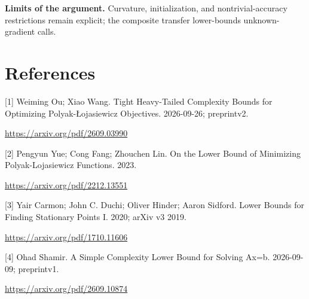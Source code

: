 \documentclass[10pt,a4paper]{article}
\begin{document}
\textbf{Limits of the argument.} Curvature, initialization, and nontrivial-accuracy restrictions remain explicit; the composite transfer lower-bounds unknown-gradient calls.

\section{References}
[1] Weiming Ou; Xiao Wang. Tight Heavy-Tailed Complexity Bounds for Optimizing Polyak-Łojasiewicz Objectives. 2026-09-26; preprintv2.

\url{https://arxiv.org/pdf/2609.03990}

[2] Pengyun Yue; Cong Fang; Zhouchen Lin. On the Lower Bound of Minimizing Polyak-Lojasiewicz Functions. 2023.

\url{https://arxiv.org/pdf/2212.13551}

[3] Yair Carmon; John C. Duchi; Oliver Hinder; Aaron Sidford. Lower Bounds for Finding Stationary Points I. 2020; arXiv v3 2019.

\url{https://arxiv.org/pdf/1710.11606}

[4] Ohad Shamir. A Simple Complexity Lower Bound for Solving Ax=b. 2026-09-09; preprintv1.

\url{https://arxiv.org/pdf/2609.10874}
\end{document}
